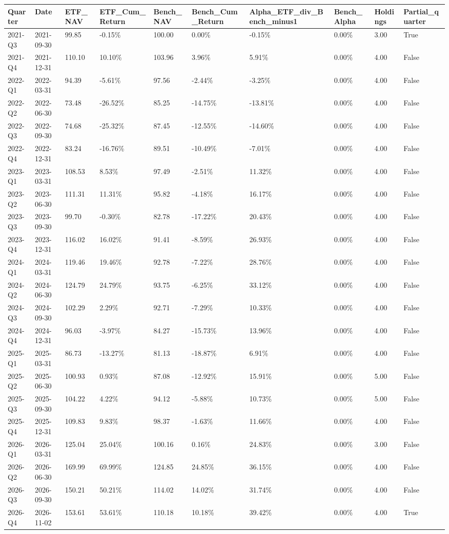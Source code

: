 \begin{longtable}{llllllllll}
Quarter & Date & ETF\_NAV & ETF\_Cum\_Return & Bench\_NAV & Bench\_Cum\_Return & Alpha\_ETF\_div\_Bench\_minus1 & Bench\_Alpha & Holdings & Partial\_quarter \\
\hline
2021-Q3 & 2021-09-30 & 99.85 & -0.15\% & 100.00 & 0.00\% & -0.15\% & 0.00\% & 3.00 & True \\
2021-Q4 & 2021-12-31 & 110.10 & 10.10\% & 103.96 & 3.96\% & 5.91\% & 0.00\% & 4.00 & False \\
2022-Q1 & 2022-03-31 & 94.39 & -5.61\% & 97.56 & -2.44\% & -3.25\% & 0.00\% & 4.00 & False \\
2022-Q2 & 2022-06-30 & 73.48 & -26.52\% & 85.25 & -14.75\% & -13.81\% & 0.00\% & 4.00 & False \\
2022-Q3 & 2022-09-30 & 74.68 & -25.32\% & 87.45 & -12.55\% & -14.60\% & 0.00\% & 4.00 & False \\
2022-Q4 & 2022-12-31 & 83.24 & -16.76\% & 89.51 & -10.49\% & -7.01\% & 0.00\% & 4.00 & False \\
2023-Q1 & 2023-03-31 & 108.53 & 8.53\% & 97.49 & -2.51\% & 11.32\% & 0.00\% & 4.00 & False \\
2023-Q2 & 2023-06-30 & 111.31 & 11.31\% & 95.82 & -4.18\% & 16.17\% & 0.00\% & 4.00 & False \\
2023-Q3 & 2023-09-30 & 99.70 & -0.30\% & 82.78 & -17.22\% & 20.43\% & 0.00\% & 4.00 & False \\
2023-Q4 & 2023-12-31 & 116.02 & 16.02\% & 91.41 & -8.59\% & 26.93\% & 0.00\% & 4.00 & False \\
2024-Q1 & 2024-03-31 & 119.46 & 19.46\% & 92.78 & -7.22\% & 28.76\% & 0.00\% & 4.00 & False \\
2024-Q2 & 2024-06-30 & 124.79 & 24.79\% & 93.75 & -6.25\% & 33.12\% & 0.00\% & 4.00 & False \\
2024-Q3 & 2024-09-30 & 102.29 & 2.29\% & 92.71 & -7.29\% & 10.33\% & 0.00\% & 4.00 & False \\
2024-Q4 & 2024-12-31 & 96.03 & -3.97\% & 84.27 & -15.73\% & 13.96\% & 0.00\% & 4.00 & False \\
2025-Q1 & 2025-03-31 & 86.73 & -13.27\% & 81.13 & -18.87\% & 6.91\% & 0.00\% & 4.00 & False \\
2025-Q2 & 2025-06-30 & 100.93 & 0.93\% & 87.08 & -12.92\% & 15.91\% & 0.00\% & 5.00 & False \\
2025-Q3 & 2025-09-30 & 104.22 & 4.22\% & 94.12 & -5.88\% & 10.73\% & 0.00\% & 5.00 & False \\
2025-Q4 & 2025-12-31 & 109.83 & 9.83\% & 98.37 & -1.63\% & 11.66\% & 0.00\% & 4.00 & False \\
2026-Q1 & 2026-03-31 & 125.04 & 25.04\% & 100.16 & 0.16\% & 24.83\% & 0.00\% & 3.00 & False \\
2026-Q2 & 2026-06-30 & 169.99 & 69.99\% & 124.85 & 24.85\% & 36.15\% & 0.00\% & 4.00 & False \\
2026-Q3 & 2026-09-30 & 150.21 & 50.21\% & 114.02 & 14.02\% & 31.74\% & 0.00\% & 4.00 & False \\
2026-Q4 & 2026-11-02 & 153.61 & 53.61\% & 110.18 & 10.18\% & 39.42\% & 0.00\% & 4.00 & True \\
\end{longtable}
